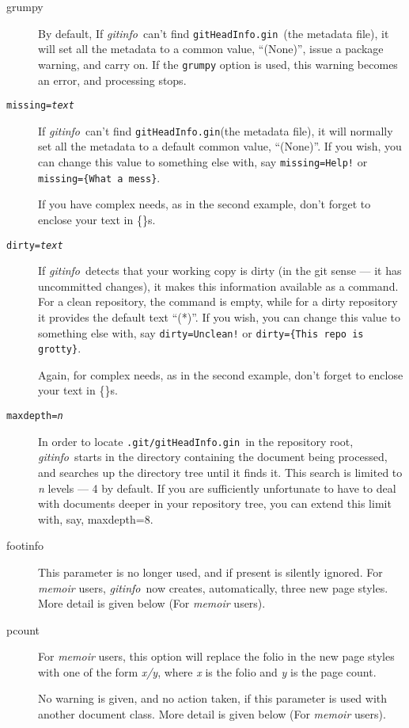 \documentclass[a4paper,12pt,twoside,openany]{memoir}
\newcommand{\sfit}[1]{\textit{#1}}
\newcommand{\tpname}{\sfit{gitinfo}}
\newcommand{\ginname}{gitHeadInfo.gin}
\newcommand{\metaname}{\texttt{\ginname}}
\newcommand{\metapath}{\texttt{.git/\ginname}}
\begin{document}
\begin{description}

\item[grumpy]
By default, If \tpname\ can't find \metaname\ (the metadata file),
it will set all the metadata to a common value, ``(None)'',
issue a package warning, and carry on.
If the \texttt{grumpy} option is used,
this warning becomes an error, and processing stops.

\item[\texttt{missing=\textit{text}}]
If \tpname\ can't find \metaname (the metadata file),
it will normally set all the metadata to a default common value, ``(None)''.
If you wish, you can change this value to something else with, say
\texttt{missing=Help!} or \texttt{missing=\{What a mess\}}.

If you have complex needs, as in the second example,
don't forget to enclose your text in \{\}s.

\item[\texttt{dirty=\textit{text}}]
If \tpname\ detects that your working copy is dirty
(in the git sense --- it has uncommitted changes),
it makes this information available as a command.
For a clean repository, the command is empty, while for a dirty repository
it provides the default text ``(*)''.
If you wish, you can change this value to something else with, say
\texttt{dirty=Unclean!} or \texttt{dirty=\{This repo is grotty\}}.

Again, for complex needs, as in the second example,
don't forget to enclose your text in \{\}s.

\item[\texttt{maxdepth=\textit{n}}]
In order to locate \metapath\ in the repository root,
\tpname\ starts in the directory containing the document being processed,
and searches up the directory tree until it finds it.
This search is limited to {\ttfamily\itshape n} levels --- 4 by default.
If you are sufficiently unfortunate to have to deal with documents
deeper in your repository tree, you can extend this limit with, say,
{\ttfamily maxdepth=8}.

\item[footinfo]
This parameter is no longer used, and if present is silently ignored.
For \sfit{memoir} users, \tpname\ now creates, automatically,
three new page styles.
More detail is given below (For \sfit{memoir} users).

\item[pcount]
For \sfit{memoir} users, this option will replace the folio
in the new page styles with one of the form \textit{x/y},
where \textit{x} is the folio and \textit{y} is the page count.

No warning is given, and no action taken,
if this parameter is used with another document class.
More detail is given below (For \sfit{memoir} users).
\end{description}
\clearpage
\end{document}
